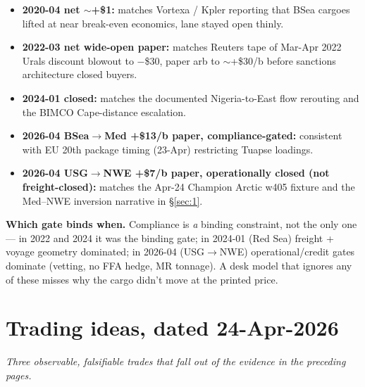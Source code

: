 \documentclass[10pt,a4paper]{article}
\begin{document}
\vspace{0.25cm}
\begin{callout}
\footnotesize
\begin{itemize}[leftmargin=1em,itemsep=0pt]
\item \textbf{2020-04 net $\sim$+\$1:} matches Vortexa / Kpler reporting that BSea cargoes lifted at near break-even economics, lane stayed open thinly.
\item \textbf{2022-03 net wide-open paper:} matches Reuters tape of Mar-Apr 2022 Urals discount blowout to $-$\$30, paper arb to $\sim$+\$30/b before sanctions architecture closed buyers.
\item \textbf{2024-01 closed:} matches the documented Nigeria-to-East flow rerouting and the BIMCO Cape-distance escalation.
\item \textbf{2026-04 BSea$\rightarrow$Med +\$13/b paper, compliance-gated:} consistent with EU 20th package timing (23-Apr) restricting Tuapse loadings.
\item \textbf{2026-04 USG$\rightarrow$NWE +\$7/b paper, operationally closed (not freight-closed):} matches the Apr-24 Champion Arctic w405 fixture and the Med--NWE inversion narrative in \S\ref{sec:1}.
\end{itemize}
\smallskip
\textbf{Which gate binds when.} Compliance is \emph{a} binding constraint, not the only one --- in 2022 and 2024 it was the binding gate; in 2024-01 (Red Sea) freight + voyage geometry dominated; in 2026-04 (USG$\rightarrow$NWE) operational/credit gates dominate (vetting, no FFA hedge, MR tonnage). A desk model that ignores any of these misses why the cargo didn't move at the printed price.
\end{callout}

\vspace{0.2cm}

\newpage

\section{Trading ideas, dated 24-Apr-2026}\label{sec:13}

\textit{Three observable, falsifiable trades that fall out of the evidence in the preceding pages.}
\end{document}
